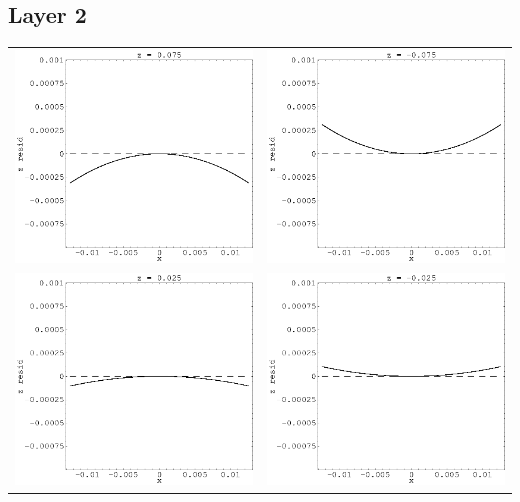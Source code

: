 \documentclass[12pt]{article}
\begin{document}
\pagebreak

\subsection*{Layer 2}
  \begin{tabular}{c c}
    \includegraphics[width=7.3 cm]{layer2_left2.eps} &
    \includegraphics[width=7.3 cm]{layer2_right2.eps} \\
    \includegraphics[width=7.3 cm]{layer2_left1.eps} &
    \includegraphics[width=7.3 cm]{layer2_right1.eps} \\
  \end{tabular}
\end{document}
